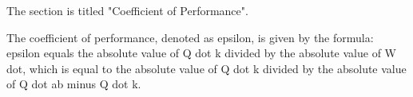 The section is titled "Coefficient of Performance".

The coefficient of performance, denoted as epsilon, is given by the formula:
epsilon equals the absolute value of Q dot k divided by the absolute value of W dot, which is equal to the absolute value of Q dot k divided by the absolute value of Q dot ab minus Q dot k.